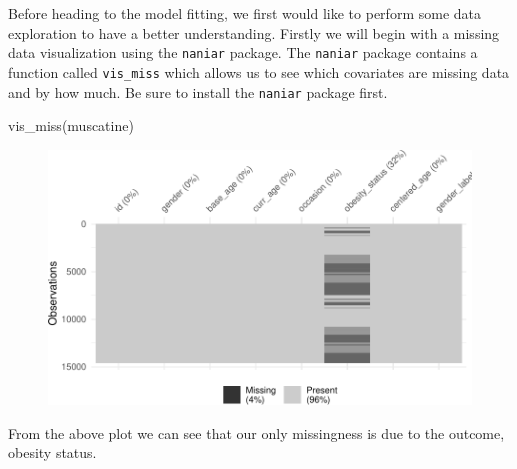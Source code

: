 \documentclass[
  letterpaper,
  DIV=11,
  numbers=noendperiod]{scrreprt}
\newenvironment{Shaded}{\begin{snugshade}}{\end{snugshade}}
\newcommand{\FunctionTok}[1]{\textcolor[rgb]{0.28,0.35,0.67}{#1}}
\newcommand{\NormalTok}[1]{\textcolor[rgb]{0.00,0.23,0.31}{#1}}
\begin{document}
Before heading to the model fitting, we first would like to perform some
data exploration to have a better understanding. Firstly we will begin
with a missing data visualization using the \texttt{naniar} package. The
\texttt{naniar} package contains a function called \texttt{vis\_miss}
which allows us to see which covariates are missing data and by how
much. Be sure to install the \texttt{naniar} package first.

\begin{Shaded}
\begin{Highlighting}[]
\FunctionTok{vis\_miss}\NormalTok{(muscatine)}
\end{Highlighting}
\end{Shaded}

\begin{figure}[H]

{\centering \includegraphics{Longi_noncontinuous_files/figure-pdf/unnamed-chunk-6-1.pdf}

}

\end{figure}

From the above plot we can see that our only missingness is due to the
outcome, obesity status.
\end{document}
